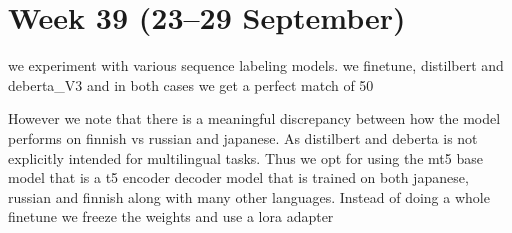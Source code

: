 \documentclass[11pt]{article}
\begin{document}
\begin{table}[ht]
    \centering
    \caption{Model performance for language-specific and combined training, with and without context}
    \label{tab:model_performance}

\end{table}


\section{Week 39 (23--29 September)}


we experiment with various sequence labeling models. we finetune, distilbert and deberta\_V3 and in both cases we get a perfect match of 50%

However we note that there is a meaningful discrepancy between how the model performs on finnish vs russian and japanese. As distilbert and deberta is not explicitly intended for multilingual tasks.
Thus we opt for using the mt5 base model that is a t5 encoder decoder model that is trained on both japanese, russian and finnish along with many other languages.
Instead of doing a whole finetune we freeze the weights and use a lora adapter 
\end{document}
